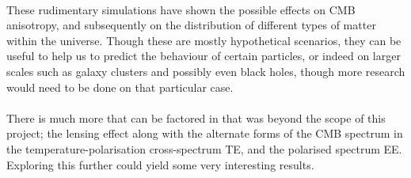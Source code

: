 \documentclass[twoside, fontsize=12pt,
     bibliography=totoc, %
     listof=totoc, %
     index=totoc, %
     onehalfspacing %
]{_MScDiss2017_cls}
\begin{document}
\paragraph{}

These rudimentary simulations have shown the possible effects on CMB anisotropy, and subsequently on the distribution of different types of matter within the universe. Though these are mostly hypothetical scenarios, they can be useful to help us to predict the behaviour of certain particles, or indeed on larger scales such as galaxy clusters and possibly even black holes, though more research would need to be done on that particular case.

\paragraph{}

There is much more that can be factored in that was beyond the scope of this project; the lensing effect along with the alternate forms of the CMB spectrum in the temperature-polarisation cross-spectrum TE, and the polarised spectrum EE. Exploring this further could yield some very interesting results.

\begin{singlespace}%
    
\end{singlespace}
\end{document}
